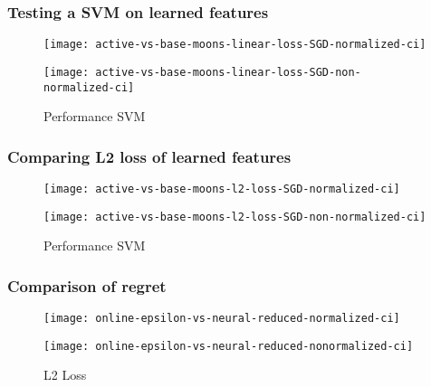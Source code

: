\documentclass{beamer}
\begin{document}
\begin{frame}
    \frametitle{Testing a SVM on learned features}
\begin{figure}[!h]
    \centering
    \begin{minipage}{.5\textwidth}
      \centering
      \texttt{[image: active-vs-base-moons-linear-loss-SGD-normalized-ci]}
    \end{minipage}%
    \begin{minipage}{.5\textwidth}
      \centering
      \texttt{[image: active-vs-base-moons-linear-loss-SGD-non-normalized-ci]}
    \end{minipage}
    \caption{Performance SVM}
  \end{figure}
\end{frame}

\begin{frame}{}
    \frametitle{Comparing L2 loss of learned features}
\begin{figure}[!h]
    \centering
    \begin{minipage}{.5\textwidth}
      \centering
      \texttt{[image: active-vs-base-moons-l2-loss-SGD-normalized-ci]}
    \end{minipage}%
    \begin{minipage}{.5\textwidth}
      \centering
      \texttt{[image: active-vs-base-moons-l2-loss-SGD-non-normalized-ci]}
    \end{minipage}
    \caption{Performance SVM}
  \end{figure}
\end{frame}



\begin{frame}{}
    \frametitle{Comparison of regret}

\begin{figure}[!h]
    \centering
    \begin{minipage}{.5\textwidth}
      \centering
      \texttt{[image: online-epsilon-vs-neural-reduced-normalized-ci]}
    \end{minipage}%
    \begin{minipage}{.5\textwidth}
      \centering
      \texttt{[image: online-epsilon-vs-neural-reduced-nonormalized-ci]}
    \end{minipage}
    \caption{L2 Loss}
  \end{figure}
\end{frame}
\end{document}
